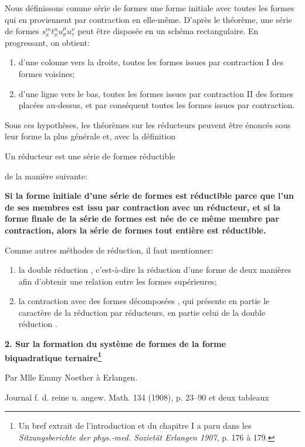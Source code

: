 \documentclass[11pt]{article}
\begin{document}
Nous définissons comme \og série de formes \fg{} une forme initiale avec toutes les formes qui en proviennent par contraction en elle-même. D'après le théorème, une série de formes $s_x^m t_x^n u_\sigma^\mu u_\tau^\nu$ peut être disposée en un schéma rectangulaire. En progressant, on obtient:
\begin{enumerate}
\item d'une colonne vers la droite, toutes les formes issues par contraction I des formes voisines;
\item d'une ligne vers le bas, toutes les formes issues par contraction II des formes placées au-dessus, et par conséquent toutes les formes issues par contraction.
\end{enumerate}

Sous ces hypothèses, les théorèmes sur les réducteurs peuvent être énoncés sous leur forme la plus générale et, avec la définition
\begin{center}
\og Un réducteur est une série de formes réductible \fg{}
\end{center}
de la manière suivante:

\begin{center}
\textbf{Si la forme initiale d'une série de formes est réductible parce que l'un de ses membres est issu par contraction avec un réducteur, et si la forme finale de la série de formes est née de ce même membre par contraction, alors la série de formes tout entière est réductible.}
\end{center}

Comme autres méthodes de réduction, il faut mentionner:
\begin{enumerate}
\item la \og double réduction \fg{}, c'est-à-dire la réduction d'une forme de deux manières afin d'obtenir une relation entre les formes supérieures;
\item la \og contraction avec des formes décomposées \fg{}, qui présente en partie le caractère de la réduction par réducteurs, en partie celui de la \og double réduction \fg{}.
\end{enumerate}

\clearpage
\setcounter{footnote}{0}

\begin{center}
{\Large\bfseries 2. Sur la formation du système de formes de la forme\\ biquadratique ternaire\footnote{Un bref extrait de l'introduction et du chapitre I a paru dans les \emph{Sitzungsberichte der phys.-med. Sozietät Erlangen 1907}, p. 176 à 179.}}\par
\vspace{0.8em}
Par Mlle Emmy Noether à Erlangen.\par
\vspace{1.2em}
Journal f. d. reine u. angew. Math. 134 (1908), p. 23--90 et deux tableaux
\end{center}
\end{document}
